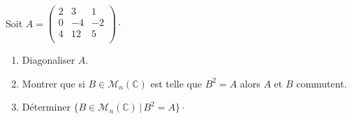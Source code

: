 \documentclass[a4paper,10pt]{report}
\begin{document}
\begin{Exercice}{} Soit $A= \begin{pmatrix}
2 & 3 & 1 \\
0 & -4 & -2 \\
4 & 12 & 5 \\
\end{pmatrix}\cdot$

\begin{enumerate}
\item Diagonaliser $A$.
\item Montrer que si $B \in \mathcal{M}_n(\mathbb{C})$ est telle que $B^2=A$ alors $A$ et $B$ commutent.
\item Déterminer $\lbrace B \in \mathcal{M}_n(\mathbb{C}) \, \vert \, B^2=A \rbrace \cdot$
\end{enumerate}
\end{Exercice}

\corr 
\end{document}
